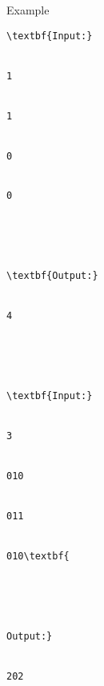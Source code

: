 Example
\begin{verbatim}
\textbf{Input:}


1


1


0


0





\textbf{Output:}


4





\textbf{Input:}


3


010


011


010\textbf{





Output:}


202\end{verbatim}